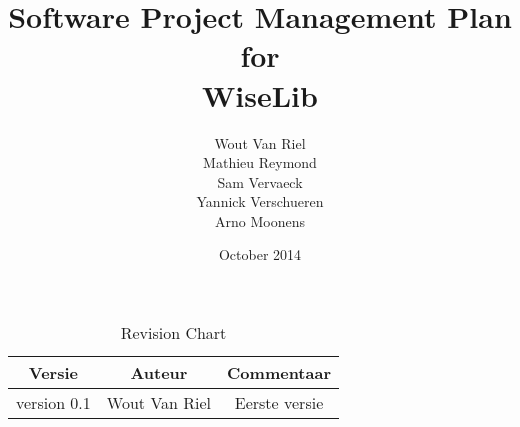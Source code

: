 \documentclass{article}
\begin{document}
\title{Software Project Management Plan \\for \\ WiseLib}
\author{Wout Van Riel \\ Mathieu Reymond \\ Sam Vervaeck \\ Yannick Verschueren \\ Arno Moonens }
\date{October 2014}

\maketitle

\newpage
\tableofcontents

\newpage

\begin{table}[h]
\centering
\begin{tabular}{c|c|c}
Versie & Auteur & Commentaar \\
\hline
 version 0.1 & Wout Van Riel & Eerste versie

\end{tabular}

\caption{Revision Chart}
\label{tab:revchart}
\end{table}













\end{document}
